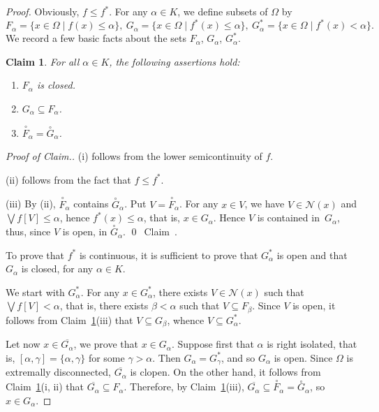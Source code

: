 \documentclass[psamsfonts,reqno]{memo-l}
\theoremstyle{plain}
\newtheorem{claim}{Claim}
\theoremstyle{definition}
\theoremstyle{remark}
\newcommand{\qedc}{{\qed}~{\rm Claim~{\theclaim}.}}
\newenvironment{cproof}
{\begin{proof}[Proof of Claim.]}
{\qedc\renewcommand{\qed}{}\end{proof}}
\numberwithin{equation}{section}
\newcommand{\Nh}{\mathcal{N}}
\newcommand{\oll}[1]{\overline{#1}}
\newcommand{\set}[1]{\{#1\}}
\newcommand{\setm}[2]{\set{#1\mid#2}}
\begin{document}
\begin{proof}
Obviously, $f\leq f^*$.
For any $\alpha\in K$, we define subsets of $\Omega$ by
   \[
   F_\alpha=\setm{x\in\Omega}{f(x)\leq\alpha},\
   G_\alpha=\setm{x\in\Omega}{f^*(x)\leq\alpha},\
   G^*_\alpha=\setm{x\in\Omega}{f^*(x)<\alpha}.
   \]
We record a few basic facts about the sets $F_\alpha$, $G_\alpha$,
$G^*_\alpha$.

\setcounter{claim}{0}
\begin{claim}\label{Cl:BasicFG}
For all $\alpha\in K$, the following assertions hold:

\begin{enumerate}
\item $F_\alpha$ is closed.

\item $G_\alpha\subseteq F_\alpha$.

\item $\overset{\,\circ}{F}_\alpha=\overset{\circ}{G}_\alpha$.
\end{enumerate}
\end{claim}

\begin{cproof}
(i) follows from the lower semicontinuity of $f$.

(ii) follows from the fact that $f\leq f^*$.

(iii) By (ii),
$\overset{\,\circ}{F}_\alpha$ contains $\overset{\circ}{G}_\alpha$. Put
$V=\overset{\,\circ}{F}_\alpha$. For any $x\in V$, we have $V\in\Nh(x)$ and
$\bigvee f[V]\leq\alpha$, hence $f^*(x)\leq\alpha$, that is, $x\in G_\alpha$.
Hence $V$ is contained in~$G_\alpha$, thus, since $V$ is open, in
$\overset{\circ}{G}_\alpha$.
\end{cproof}

To prove that $f^*$ is continuous, it is sufficient to
prove that $G_\alpha^*$ is open and that $G_\alpha$ is closed, for any
$\alpha\in K$.

We start with $G_\alpha^*$. For any $x\in G_\alpha^*$, there exists
$V\in\Nh(x)$ such that $\bigvee f[V]<\alpha$, that is, there exists
$\beta<\alpha$ such that $V\subseteq F_\beta$. Since $V$ is open, it
follows from Claim~\ref{Cl:BasicFG}(iii) that $V\subseteq G_\beta$, whence
$V\subseteq G_\alpha^*$.

Let now $x\in\oll{G_\alpha}$, we prove that $x\in G_\alpha$. Suppose
first that $\alpha$ is right isolated, that is,
$[\alpha,\gamma]=\set{\alpha,\gamma}$ for some $\gamma>\alpha$. Then
$G_\alpha=G^*_\gamma$, and so $G_\alpha$ is open. Since $\Omega$ is
extremally disconnected, $\oll{G_\alpha}$ is clopen. On the other hand,
it follows from Claim~\ref{Cl:BasicFG}(i, ii) that
$\oll{G_\alpha}\subseteq F_\alpha$. Therefore, by
Claim~\ref{Cl:BasicFG}(iii),
$\oll{G_\alpha}\subseteq\overset{\,\circ}{F}_\alpha=
\overset{\circ}{G}_\alpha$, so $x\in G_\alpha$.


\end{proof}
\end{document}

